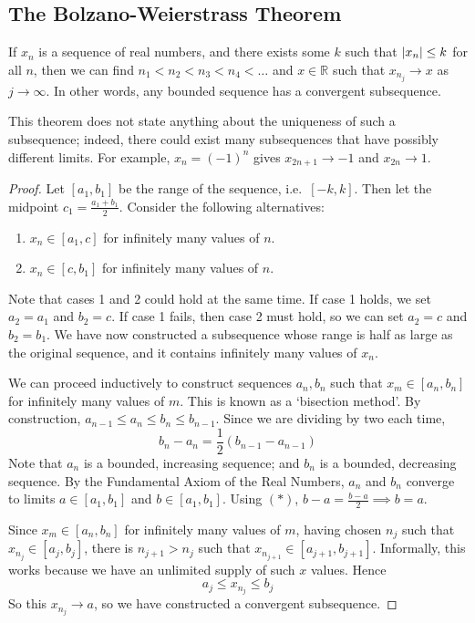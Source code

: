 \subsection{The Bolzano-Weierstrass Theorem}
\begin{theorem}
	If \(x_n\) is a sequence of real numbers, and there exists some \(k\) such that \(\abs{x_n} \leq k\) for all \(n\), then we can find \(n_1 < n_2 < n_3 < n_4 < \dots\) and \(x \in \mathbb R\) such that \(x_{n_j} \to x\) as \(j \to \infty\).
	In other words, any bounded sequence has a convergent subsequence.
\end{theorem}
\begin{remark}
	This theorem does not state anything about the uniqueness of such a subsequence; indeed, there could exist many subsequences that have possibly different limits.
	For example, \(x_n = (-1)^n\) gives \(x_{2n+1} \to -1\) and \(x_{2n} \to 1\).
\end{remark}
\begin{proof}
	Let \([a_1, b_1]\) be the range of the sequence, i.e.\ \([-k, k]\).
	Then let the midpoint \(c_1 = \frac{a_1 + b_1}{2}\).
	Consider the following alternatives:
	\begin{enumerate}
		\item \(x_n \in [a_1, c]\) for infinitely many values of \(n\).
		\item \(x_n \in [c, b_1]\) for infinitely many values of \(n\).
	\end{enumerate}
	Note that cases 1 and 2 could hold at the same time.
	If case 1 holds, we set \(a_2 = a_1\) and \(b_2 = c\).
	If case 1 fails, then case 2 must hold, so we can set \(a_2 = c\) and \(b_2 = b_1\).
	We have now constructed a subsequence whose range is half as large as the original sequence, and it contains infinitely many values of \(x_n\).
	
	We can proceed inductively to construct sequences \(a_n, b_n\) such that \(x_m \in [a_n, b_n]\) for infinitely many values of \(m\).
	This is known as a `bisection method'.
	By construction, \(a_{n-1} \leq a_n \leq b_n \leq b_{n-1}\).
	Since we are dividing by two each time,
	\[
		b_n - a_n = \frac{1}{2}(b_{n-1} - a_{n-1}) \tag{\(\ast\)}
	\]
	Note that \(a_n\) is a bounded, increasing sequence; and \(b_n\) is a bounded, decreasing sequence.
	By the Fundamental Axiom of the Real Numbers, \(a_n\) and \(b_n\) converge to limits \(a \in [a_1, b_1]\) and \(b \in [a_1, b_1]\).
	Using \((\ast)\), \(b-a = \frac{b-a}{2} \implies b = a\).
	
	Since \(x_m \in [a_n, b_n]\) for infinitely many values of \(m\), having chosen \(n_j\) such that \(x_{n_j} \in [a_j, b_j]\), there is \(n_{j+1} > n_j\) such that \(x_{n_{j+1}} \in [a_{j+1}, b_{j+1}]\).
	Informally, this works because we have an unlimited supply of such \(x\) values.
	Hence
	\[
		a_j \leq x_{n_j} \leq b_j
	\]
	So this \(x_{n_j} \to a\), so we have constructed a convergent subsequence.
\end{proof}

